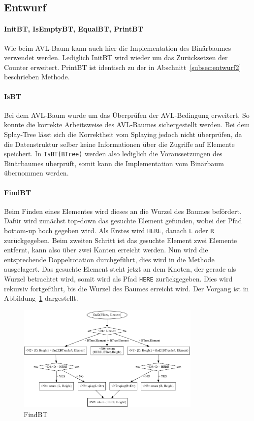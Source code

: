 \subsection{Entwurf}\label{subsec:splay-entwurf}

\paragraph{InitBT, IsEmptyBT, EqualBT, PrintBT}
Wie beim AVL-Baum kann auch hier die Implementation des Binärbaumes verwendet werden.
Lediglich InitBT wird wieder um das Zurücksetzen der Counter erweitert.
PrintBT ist identisch zu der in Abschnitt~\ref{subsec:entwurf2} beschrieben Methode.

\paragraph{IsBT}
Bei dem AVL-Baum wurde  um das Überprüfen der AVL-Bedingung erweitert.
So konnte die korrekte Arbeitsweise des AVL-Baumes sichergestellt werden.
Bei dem Splay-Tree lässt sich die Korrektheit vom Splaying jedoch nicht überprüfen, da die
Datenstruktur selber keine Informationen über die Zugriffe auf Elemente speichert.
In \verb|IsBT(BTree)| werden also lediglich die Voraussetzungen des Binärbaumes überprüft,
somit kann die Implementation vom Binärbaum übernommen werden.

\paragraph{FindBT}\label{par:splay-findBT}
Beim Finden eines Elementes wird dieses an die Wurzel des Baumes befördert.
Dafür wird zunächst top-down das gesuchte Element gefunden, wobei der Pfad
bottom-up hoch gegeben wird.
Als Erstes wird \verb|HERE|, danach \verb|L| oder \verb|R| zurückgegeben.
Beim zweiten Schritt ist das gesuchte Element zwei Elemente entfernt, kann also über zwei
Kanten erreicht werden.
Nun wird die entsprechende Doppelrotation durchgeführt, dies wird in die 
Methode ausgelagert.
Das gesuchte Element steht jetzt an dem Knoten, der gerade als Wurzel betrachtet wird, somit wird
als Pfad \verb|HERE| zurückgegeben.
Dies wird rekursiv fortgeführt, bis die Wurzel des Baumes erreicht wird.
Der Vorgang ist in Abbildung~\ref{fig:splayFind} dargestellt.
\begin{figure}[hbt]
    \centering
    \includegraphics[width=0.8\textwidth]{img/gv/splayFind2}
    \caption{FindBT}
    \label{fig:splayFind}
\end{figure}

